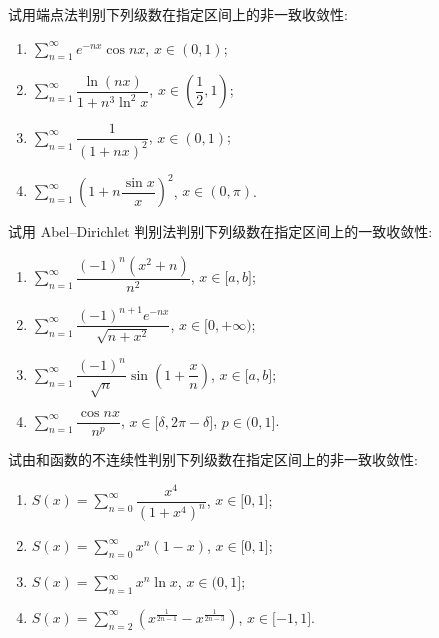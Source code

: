 \documentclass[../数学分析培优讲义.tex]{subfiles}
\begin{document}
\begin{example}
试用端点法判别下列级数在指定区间上的非一致收敛性:
\begin{enumerate}[label=(\arabic*)]
    \item $\displaystyle\sum\limits_{n=1}^{\infty}e^{-nx}\cos nx$, $x\in(0,1)$;
    \item $\displaystyle\sum\limits_{n=1}^{\infty}\dfrac{\ln(nx)}{1+n^3\ln^2x}$, $x\in\left(\dfrac{1}{2},1\right)$;
    \item $\displaystyle\sum\limits_{n=1}^{\infty}\dfrac{1}{(1+nx)^2}$, $x\in(0,1)$;
    \item $\displaystyle\sum\limits_{n=1}^{\infty}\left(1+n\dfrac{\sin x}{x}\right)^2$, $x\in(0,\pi)$.
\end{enumerate}
\end{example}
\exampleblank

\begin{example}
试用 Abel--Dirichlet 判别法判别下列级数在指定区间上的一致收敛性:
\begin{enumerate}[label=(\arabic*)]
    \item $\displaystyle\sum\limits_{n=1}^{\infty}\dfrac{(-1)^n(x^2+n)}{n^2}$, $x\in\lbrack a,b\rbrack$;
    \item $\displaystyle\sum\limits_{n=1}^{\infty}\dfrac{(-1)^{n+1}e^{-nx}}{\sqrt{n+x^2}}$, $x\in\lbrack 0,+\infty)$;
    \item $\displaystyle\sum\limits_{n=1}^{\infty}\dfrac{(-1)^n}{\sqrt n}\sin\left(1+\dfrac{x}{n}\right)$, $x\in\lbrack a,b\rbrack$;
    \item $\displaystyle\sum\limits_{n=1}^{\infty}\dfrac{\cos nx}{n^p}$, $x\in\lbrack \delta,2\pi-\delta\rbrack$, $p\in(0,1\rbrack$.
\end{enumerate}
\end{example}
\exampleblank

\begin{example}
试由和函数的不连续性判别下列级数在指定区间上的非一致收敛性:
\begin{enumerate}[label=(\arabic*)]
    \item $\displaystyle S(x)=\sum\limits_{n=0}^{\infty}\dfrac{x^4}{(1+x^4)^n}$, $x\in\lbrack 0,1\rbrack$;
    \item $\displaystyle S(x)=\sum\limits_{n=0}^{\infty}x^n(1-x)$, $x\in\lbrack 0,1\rbrack$;
    \item $\displaystyle S(x)=\sum\limits_{n=1}^{\infty}x^n\ln x$, $x\in(0,1\rbrack$;
    \item $\displaystyle S(x)=\sum\limits_{n=2}^{\infty}\left(x^{\frac{1}{2n-1}}-x^{\frac{1}{2n-3}}\right)$, $x\in\lbrack -1,1\rbrack$.
\end{enumerate}
\end{example}
\exampleblank
\end{document}
